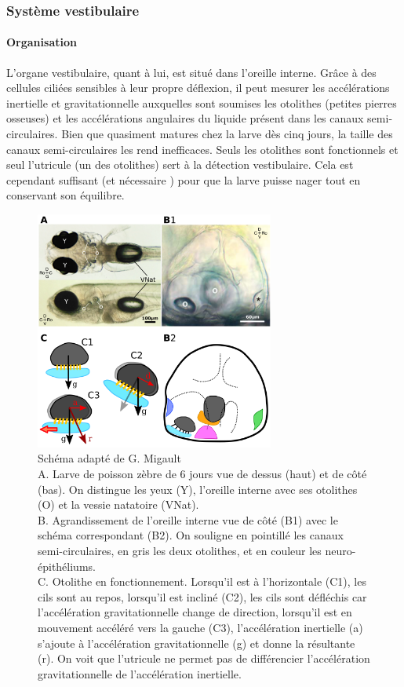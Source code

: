 \subsubsection{Système vestibulaire}

\paragraph{Organisation}
L'organe vestibulaire, quant à lui, est situé dans l'oreille interne. Grâce à des cellules ciliées sensibles à leur propre déflexion, il peut mesurer les accélérations inertielle et gravitationnelle auxquelles sont soumises les otolithes (petites pierres osseuses) et les accélérations angulaires du liquide présent dans les canaux semi-circulaires. Bien que quasiment matures chez la larve dès cinq jours, la taille des canaux semi-circulaires les rend inefficaces. Seuls les otolithes sont fonctionnels et seul l'utricule (un des otolithes) sert à la détection vestibulaire. Cela est cependant suffisant (et nécessaire \cite{riley_development_2000}) pour que la larve puisse nager tout en conservant son équilibre.

\begin{figure}
\centering
\includegraphics[width=0.7\textwidth]{./files/appareil_vestibulaire.svg.png}
\caption{
Schéma adapté de G. Migault
\\
A. Larve de poisson zèbre de 6 jours vue de dessus (haut) et de côté (bas). On distingue les yeux (Y), l'oreille interne avec ses otolithes (O) et la vessie natatoire (VNat).
\\
B. Agrandissement de l'oreille interne vue de côté (B1) avec le schéma correspondant (B2). On souligne en pointillé les canaux semi-circulaires, en gris les deux otolithes, et en couleur les neuro-épithéliums.
\\
C. Otolithe en fonctionnement. Lorsqu'il est à l'horizontale (C1), les cils sont au repos, lorsqu'il est incliné (C2), les cils sont défléchis car l'accélération gravitationnelle change de direction, lorsqu'il est en mouvement accéléré vers la gauche (C3), l'accélération inertielle (a) s'ajoute à l'accélération gravitationnelle (g) et donne la résultante (r). On voit que l'utricule ne permet pas de différencier l'accélération gravitationnelle de l'accélération inertielle.}
\end{figure}

